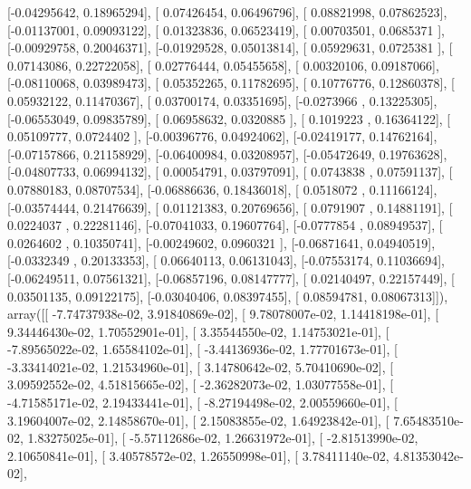 \documentclass{article}
\begin{document}
       [-0.04295642,  0.18965294],
       [ 0.07426454,  0.06496796],
       [ 0.08821998,  0.07862523],
       [-0.01137001,  0.09093122],
       [ 0.01323836,  0.06523419],
       [ 0.00703501,  0.0685371 ],
       [-0.00929758,  0.20046371],
       [-0.01929528,  0.05013814],
       [ 0.05929631,  0.0725381 ],
       [ 0.07143086,  0.22722058],
       [ 0.02776444,  0.05455658],
       [ 0.00320106,  0.09187066],
       [-0.08110068,  0.03989473],
       [ 0.05352265,  0.11782695],
       [ 0.10776776,  0.12860378],
       [ 0.05932122,  0.11470367],
       [ 0.03700174,  0.03351695],
       [-0.0273966 ,  0.13225305],
       [-0.06553049,  0.09835789],
       [ 0.06958632,  0.0320885 ],
       [ 0.1019223 ,  0.16364122],
       [ 0.05109777,  0.0724402 ],
       [-0.00396776,  0.04924062],
       [-0.02419177,  0.14762164],
       [-0.07157866,  0.21158929],
       [-0.06400984,  0.03208957],
       [-0.05472649,  0.19763628],
       [-0.04807733,  0.06994132],
       [ 0.00054791,  0.03797091],
       [ 0.0743838 ,  0.07591137],
       [ 0.07880183,  0.08707534],
       [-0.06886636,  0.18436018],
       [ 0.0518072 ,  0.11166124],
       [-0.03574444,  0.21476639],
       [ 0.01121383,  0.20769656],
       [ 0.0791907 ,  0.14881191],
       [ 0.0224037 ,  0.22281146],
       [-0.07041033,  0.19607764],
       [-0.0777854 ,  0.08949537],
       [ 0.0264602 ,  0.10350741],
       [-0.00249602,  0.0960321 ],
       [-0.06871641,  0.04940519],
       [-0.0332349 ,  0.20133353],
       [ 0.06640113,  0.06131043],
       [-0.07553174,  0.11036694],
       [-0.06249511,  0.07561321],
       [-0.06857196,  0.08147777],
       [ 0.02140497,  0.22157449],
       [ 0.03501135,  0.09122175],
       [-0.03040406,  0.08397455],
       [ 0.08594781,  0.08067313]]), array([[ -7.74737938e-02,   3.91840869e-02],
       [  9.78078007e-02,   1.14418198e-01],
       [  9.34446430e-02,   1.70552901e-01],
       [  3.35544550e-02,   1.14753021e-01],
       [ -7.89565022e-02,   1.65584102e-01],
       [ -3.44136936e-02,   1.77701673e-01],
       [ -3.33414021e-02,   1.21534960e-01],
       [  3.14780642e-02,   5.70410690e-02],
       [  3.09592552e-02,   4.51815665e-02],
       [ -2.36282073e-02,   1.03077558e-01],
       [ -4.71585171e-02,   2.19433441e-01],
       [ -8.27194498e-02,   2.00559660e-01],
       [  3.19604007e-02,   2.14858670e-01],
       [  2.15083855e-02,   1.64923842e-01],
       [  7.65483510e-02,   1.83275025e-01],
       [ -5.57112686e-02,   1.26631972e-01],
       [ -2.81513990e-02,   2.10650841e-01],
       [  3.40578572e-02,   1.26550998e-01],
       [  3.78411140e-02,   4.81353042e-02],
\end{document}
